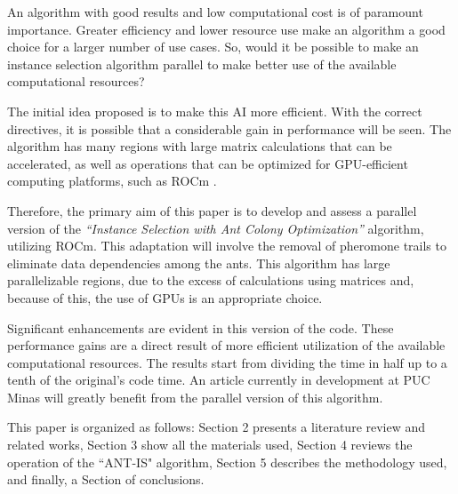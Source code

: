 An algorithm with good results and low computational cost is of paramount importance. Greater efficiency and lower resource use make an algorithm a good choice for a larger number of use cases. So, would it be possible to make an instance selection algorithm parallel to make better use of the available computational resources?

The initial idea proposed is to make this AI more efficient. With the correct directives, it is possible that a considerable gain in performance will be seen. The algorithm has many regions with large matrix calculations that can be accelerated, as well as operations that can be optimized for GPU-efficient computing platforms, such as ROCm \cite{rocm}.

Therefore, the primary aim of this paper is to develop and assess a parallel version of the \emph{``Instance Selection with Ant Colony Optimization''} algorithm, utilizing ROCm. This adaptation will involve the removal of pheromone trails to eliminate data dependencies among the ants.
This algorithm has large parallelizable regions, due to the excess of calculations using matrices and, because of this, the use of GPUs is an appropriate choice.

Significant enhancements are evident in this version of the code. These performance gains are a direct result of more efficient utilization of the available computational resources. The results start from dividing the time in half up to a tenth of the original’s code time. An article currently in development at PUC Minas will greatly benefit from the parallel version of this algorithm.

This paper is organized as follows: Section 2 presents a literature review and related works, Section 3 show all the materials used, Section 4 reviews the operation of the ``ANT-IS" algorithm, Section 5 describes the methodology used, and finally, a Section of conclusions.
